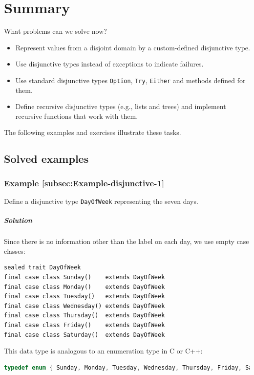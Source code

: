 \section{Summary}

What problems can we solve now?
\begin{itemize}
\item Represent values from a disjoint domain by a custom-defined disjunctive
type.
\item Use disjunctive types instead of exceptions to indicate failures.
\item Use standard disjunctive types \lstinline!Option!, \lstinline!Try!,
\lstinline!Either! and methods defined for them.
\item Define recursive disjunctive types (e.g., lists and trees) and implement
recursive functions that work with them.
\end{itemize}
The following examples and exercises illustrate these tasks.

\subsection{Solved examples}

\subsubsection{Example \label{subsec:Example-disjunctive-1}\ref{subsec:Example-disjunctive-1}}

Define a disjunctive type \lstinline!DayOfWeek! representing the
seven days.

\subparagraph{Solution}

Since there is no information other than the label on each day, we
use empty case classes:
\begin{lstlisting}
sealed trait DayOfWeek
final case class Sunday()    extends DayOfWeek
final case class Monday()    extends DayOfWeek
final case class Tuesday()   extends DayOfWeek
final case class Wednesday() extends DayOfWeek
final case class Thursday()  extends DayOfWeek
final case class Friday()    extends DayOfWeek
final case class Saturday()  extends DayOfWeek
\end{lstlisting}
This data type is analogous to an enumeration type
in C or C++:
\begin{lstlisting}[language={C++}]
typedef enum { Sunday, Monday, Tuesday, Wednesday, Thursday, Friday, Saturday } DayOfWeek;
\end{lstlisting}


